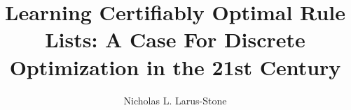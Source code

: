 \title{Learning Certifiably Optimal Rule Lists: A Case For Discrete Optimization in the 21st Century}
\author{Nicholas L. Larus-Stone}







